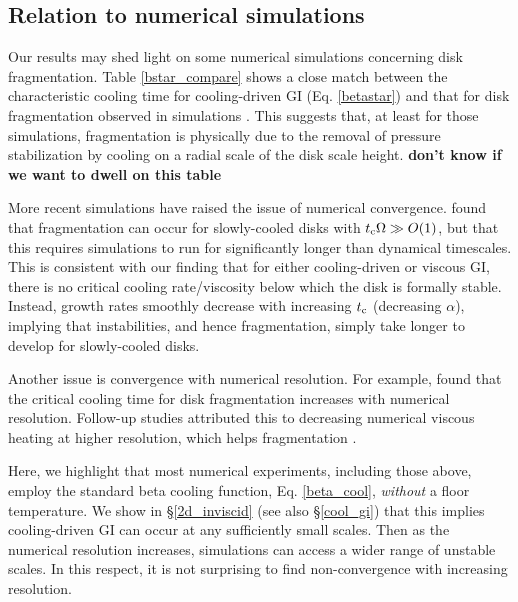 \subsection{Relation to numerical simulations}\label{prev_works}
Our results may shed light on some numerical simulations 
concerning disk fragmentation. Table 
\ref{bstar_compare} shows a close match between the characteristic
cooling time for cooling-driven GI (Eq. \ref{betastar}) 
and that for disk fragmentation observed in simulations 
\citep{gammie01,rice05,rice11}. This suggests that, at least for those
simulations, fragmentation is physically due to the removal of
pressure stabilization by cooling on a radial scale of the disk scale
height. %
{\bf don't know if we want to dwell on this table}

More recent simulations have raised the issue of numerical
convergence. \cite{paardekooper12} found that fragmentation can occur 
for  slowly-cooled disks with $t_\mathrm{c}\Omega\gg O(1)$, but that this requires   
simulations to run for significantly longer than dynamical 
timescales. This is consistent with our finding
that for either cooling-driven or viscous GI, there is no critical 
cooling rate/viscosity below  which the disk is  
formally stable. Instead, growth rates smoothly decrease with
increasing $t_\mathrm{c}$ (decreasing $\alpha$), implying that
instabilities, and hence fragmentation, simply take longer to develop
for slowly-cooled disks.         

Another issue is convergence with numerical resolution. For example,
\cite{meru11} found that the critical cooling time for 
disk fragmentation increases with numerical resolution. %
Follow-up studies attributed this to decreasing numerical viscous
heating at higher resolution, which helps fragmentation
\citep{lodato11,meru12}. %

Here, we highlight that most numerical experiments, including those
above, employ the standard beta cooling function, Eq. \ref{beta_cool},
\emph{without} a floor temperature. We show in \S\ref{2d_inviscid}
(see also \S\ref{cool_gi}) that this implies cooling-driven GI can
occur at any sufficiently small scales. Then as the numerical
resolution increases, simulations can access a wider range of unstable
scales.  %
In this respect, it is not surprising to find non-convergence with 
increasing resolution. %

